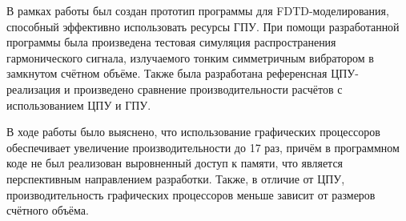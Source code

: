 
В рамках работы был создан прототип программы для FDTD-моделирования, 
способный эффективно использовать ресурсы ГПУ. При помощи разработанной 
программы была произведена тестовая симуляция распространения гармонического 
сигнала, излучаемого тонким симметричным вибратором в замкнутом счётном объёме. 
Также была разработана референсная ЦПУ-реализация и произведено сравнение 
производительности расчётов с использованием ЦПУ и ГПУ.

В ходе работы было выяснено, что использование графических процессоров 
обеспечивает увеличение производительности до 17 раз, причём в программном коде
не был реализован выровненный доступ к памяти, что является 
перспективным направлением разработки. Также, в отличие от ЦПУ, 
производительность графических процессоров меньше зависит от размеров счётного объёма.

\clearpage